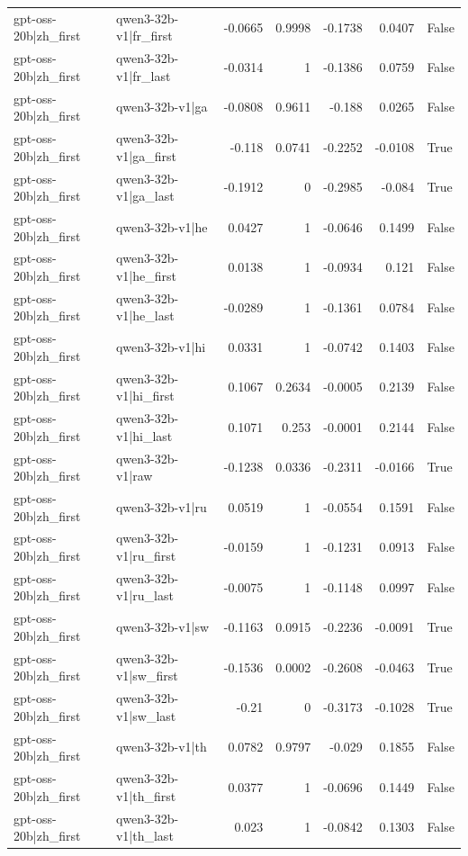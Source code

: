 \begin{table}
\begin{tabular}{l l r r r r l}
gpt-oss-20b|zh_first & qwen3-32b-v1|fr_first & -0.0665 & 0.9998 & -0.1738 & 0.0407 & False \\
gpt-oss-20b|zh_first & qwen3-32b-v1|fr_last & -0.0314 & 1 & -0.1386 & 0.0759 & False \\
gpt-oss-20b|zh_first & qwen3-32b-v1|ga & -0.0808 & 0.9611 & -0.188 & 0.0265 & False \\
gpt-oss-20b|zh_first & qwen3-32b-v1|ga_first & -0.118 & 0.0741 & -0.2252 & -0.0108 & True \\
gpt-oss-20b|zh_first & qwen3-32b-v1|ga_last & -0.1912 & 0 & -0.2985 & -0.084 & True \\
gpt-oss-20b|zh_first & qwen3-32b-v1|he & 0.0427 & 1 & -0.0646 & 0.1499 & False \\
gpt-oss-20b|zh_first & qwen3-32b-v1|he_first & 0.0138 & 1 & -0.0934 & 0.121 & False \\
gpt-oss-20b|zh_first & qwen3-32b-v1|he_last & -0.0289 & 1 & -0.1361 & 0.0784 & False \\
gpt-oss-20b|zh_first & qwen3-32b-v1|hi & 0.0331 & 1 & -0.0742 & 0.1403 & False \\
gpt-oss-20b|zh_first & qwen3-32b-v1|hi_first & 0.1067 & 0.2634 & -0.0005 & 0.2139 & False \\
gpt-oss-20b|zh_first & qwen3-32b-v1|hi_last & 0.1071 & 0.253 & -0.0001 & 0.2144 & False \\
gpt-oss-20b|zh_first & qwen3-32b-v1|raw & -0.1238 & 0.0336 & -0.2311 & -0.0166 & True \\
gpt-oss-20b|zh_first & qwen3-32b-v1|ru & 0.0519 & 1 & -0.0554 & 0.1591 & False \\
gpt-oss-20b|zh_first & qwen3-32b-v1|ru_first & -0.0159 & 1 & -0.1231 & 0.0913 & False \\
gpt-oss-20b|zh_first & qwen3-32b-v1|ru_last & -0.0075 & 1 & -0.1148 & 0.0997 & False \\
gpt-oss-20b|zh_first & qwen3-32b-v1|sw & -0.1163 & 0.0915 & -0.2236 & -0.0091 & True \\
gpt-oss-20b|zh_first & qwen3-32b-v1|sw_first & -0.1536 & 0.0002 & -0.2608 & -0.0463 & True \\
gpt-oss-20b|zh_first & qwen3-32b-v1|sw_last & -0.21 & 0 & -0.3173 & -0.1028 & True \\
gpt-oss-20b|zh_first & qwen3-32b-v1|th & 0.0782 & 0.9797 & -0.029 & 0.1855 & False \\
gpt-oss-20b|zh_first & qwen3-32b-v1|th_first & 0.0377 & 1 & -0.0696 & 0.1449 & False \\
gpt-oss-20b|zh_first & qwen3-32b-v1|th_last & 0.023 & 1 & -0.0842 & 0.1303 & False \\

\end{tabular}
\end{table}
